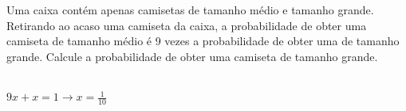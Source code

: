 \begin{ex}
Uma caixa contém apenas camisetas de tamanho médio e tamanho grande. Retirando ao acaso uma camiseta da caixa, a probabilidade de obter uma camiseta de tamanho médio é 9 vezes a probabilidade de obter uma de tamanho grande. Calcule a probabilidade de obter uma camiseta de tamanho grande.
  \begin{sol}
   \phantom{A} \\
   $9x+x=1 \rightarrow x=\frac{1}{10}$
  \end{sol}
\end{ex}